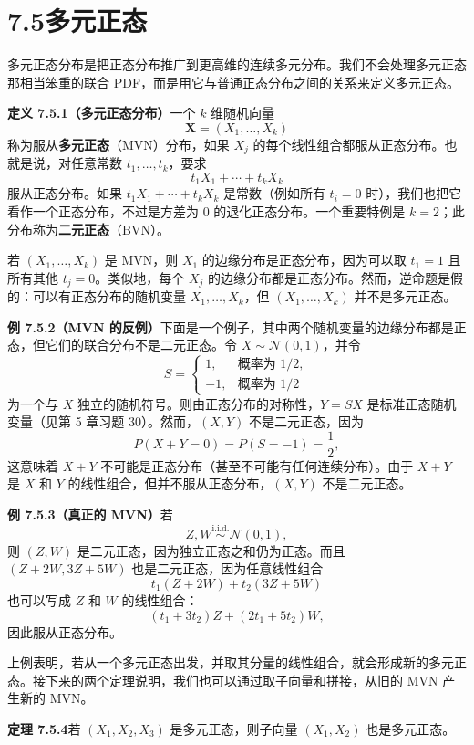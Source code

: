 \documentclass[UTF8, 12pt, fontset=fandol, oneside]{ctexart}
\begin{document}
\section*{7.5\quad 多元正态}

多元正态分布是把正态分布推广到更高维的连续多元分布。我们不会处理多元正态那相当笨重的联合 PDF，而是用它与普通正态分布之间的关系来定义多元正态。

\noindent\textbf{定义 7.5.1（多元正态分布）}\quad 一个 $k$ 维随机向量
\[
  \mathbf{X}=(X_1,\ldots,X_k)
\]
称为服从\textbf{多元正态}（MVN）分布，如果 $X_j$ 的每个线性组合都服从正态分布。也就是说，对任意常数 $t_1,\ldots,t_k$，要求
\[
  t_1X_1+\cdots+t_kX_k
\]
服从正态分布。如果 $t_1X_1+\cdots+t_kX_k$ 是常数（例如所有 $t_i=0$ 时），我们也把它看作一个正态分布，不过是方差为 $0$ 的退化正态分布。一个重要特例是 $k=2$；此分布称为\textbf{二元正态}（BVN）。

若 $(X_1,\ldots,X_k)$ 是 MVN，则 $X_1$ 的边缘分布是正态分布，因为可以取 $t_1=1$ 且所有其他 $t_j=0$。类似地，每个 $X_j$ 的边缘分布都是正态分布。然而，逆命题是假的：可以有正态分布的随机变量 $X_1,\ldots,X_k$，但 $(X_1,\ldots,X_k)$ 并不是多元正态。

\noindent\textbf{例 7.5.2（MVN 的反例）}\quad 下面是一个例子，其中两个随机变量的边缘分布都是正态，但它们的联合分布不是二元正态。令 $X\sim \mathcal{N}(0,1)$，并令
\[
  S=
  \begin{cases}
    1, & \text{概率为 }1/2,\\
    -1, & \text{概率为 }1/2
  \end{cases}
\]
为一个与 $X$ 独立的随机符号。则由正态分布的对称性，$Y=SX$ 是标准正态随机变量（见第 5 章习题 30）。然而，$(X,Y)$ 不是二元正态，因为
\[
  P(X+Y=0)=P(S=-1)=\frac12,
\]
这意味着 $X+Y$ 不可能是正态分布（甚至不可能有任何连续分布）。由于 $X+Y$ 是 $X$ 和 $Y$ 的线性组合，但并不服从正态分布，$(X,Y)$ 不是二元正态。

\noindent\textbf{例 7.5.3（真正的 MVN）}\quad 若
\[
  Z,W \stackrel{\text{i.i.d.}}{\sim}\mathcal{N}(0,1),
\]
则 $(Z,W)$ 是二元正态，因为独立正态之和仍为正态。而且 $(Z+2W,3Z+5W)$ 也是二元正态，因为任意线性组合
\[
  t_1(Z+2W)+t_2(3Z+5W)
\]
也可以写成 $Z$ 和 $W$ 的线性组合：
\[
  (t_1+3t_2)Z+(2t_1+5t_2)W,
\]
因此服从正态分布。

上例表明，若从一个多元正态出发，并取其分量的线性组合，就会形成新的多元正态。接下来的两个定理说明，我们也可以通过取子向量和拼接，从旧的 MVN 产生新的 MVN。

\noindent\textbf{定理 7.5.4}\quad 若 $(X_1,X_2,X_3)$ 是多元正态，则子向量 $(X_1,X_2)$ 也是多元正态。
\end{document}
